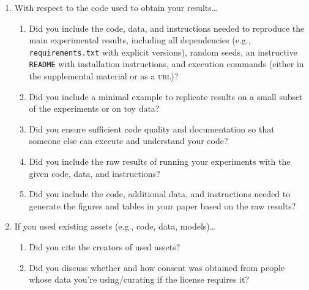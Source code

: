 \documentclass[11pt]{article}
\begin{document}
\begin{enumerate}
\begin{enumerate}
    your claims?
    \answerTODO{}
  \item Did you compare performance over time and describe how you selected the
    maximum runtime?
    \answerTODO{}
  \item Did you include the total amount of compute and the type of resources
    used (e.g., type of \textsc{gpu}s, internal cluster, or cloud provider)?
    \answerTODO{}
  \item Did you run ablation studies to assess the impact of different
    components of your approach?
    \answerTODO{}
  \end{enumerate}
\item With respect to the code used to obtain your results\dots
  \begin{enumerate}
\item Did you include the code, data, and instructions needed to reproduce the
    main experimental results, including all dependencies (e.g.,
    \texttt{requirements.txt} with explicit versions), random seeds, an instructive
    \texttt{README} with installation instructions, and execution commands
    (either in the supplemental material or as a \textsc{url})?
    \answerTODO{}
  \item Did you include a minimal example to replicate results on a small subset
    of the experiments or on toy data?
    \answerTODO{}
  \item Did you ensure sufficient code quality and documentation so that someone else
    can execute and understand your code?
    \answerTODO{}
  \item Did you include the raw results of running your experiments with the given
    code, data, and instructions?
    \answerTODO{}
  \item Did you include the code, additional data, and instructions needed to generate
    the figures and tables in your paper based on the raw results?
    \answerTODO{}
  \end{enumerate}
\item If you used existing assets (e.g., code, data, models)\dots
  \begin{enumerate}
  \item Did you cite the creators of used assets?
    \answerTODO{}
  \item Did you discuss whether and how consent was obtained from people whose
    data you're using/curating if the license requires it?

\end{enumerate}
\end{enumerate}
\end{document}
